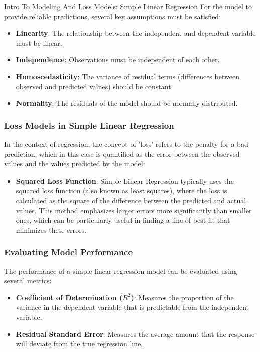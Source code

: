 \begin{notes}{Intro To Modeling And Loss Models: Simple Linear Regression}
    For the model to provide reliable predictions, several key assumptions must be satisfied:
    \begin{itemize}
        \item \textbf{Linearity}: The relationship between the independent and dependent variable must be linear.
        \item \textbf{Independence}: Observations must be independent of each other.
        \item \textbf{Homoscedasticity}: The variance of residual terms (differences between observed and predicted values) should be constant.
        \item \textbf{Normality}: The residuals of the model should be normally distributed.
    \end{itemize}
    
    \subsubsection*{Loss Models in Simple Linear Regression}
    
    In the context of regression, the concept of 'loss' refers to the penalty for a bad prediction, which in this case is quantified as the error between the observed values and the values predicted by the model:
    \begin{itemize}
        \item \textbf{Squared Loss Function}: Simple Linear Regression typically uses the squared loss function (also known as least squares), where the loss is calculated as the square of the difference 
        between the predicted and actual values. This method emphasizes larger errors more significantly than smaller ones, which can be particularly useful in finding a line of best fit that minimizes these errors.
    \end{itemize}
    
    \subsubsection*{Evaluating Model Performance}
    
    The performance of a simple linear regression model can be evaluated using several metrics:
    \begin{itemize}
        \item \textbf{Coefficient of Determination ($R^2$)}: Measures the proportion of the variance in the dependent variable that is predictable from the independent variable.
        \item \textbf{Residual Standard Error}: Measures the average amount that the response will deviate from the true regression line.
    \end{itemize}
    

\end{notes}
